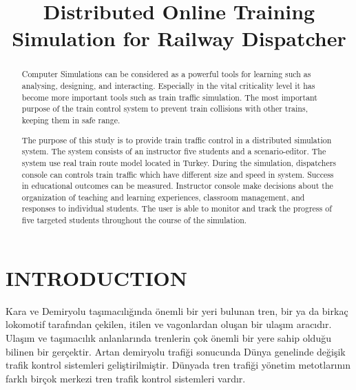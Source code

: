 \documentclass[conference]{IEEEtran}
\begin{document}
\title{Distributed Online Training Simulation for Railway Dispatcher }



\author{


}

\maketitle

\begin{abstract}
Computer Simulations can be considered as a powerful tools for learning such as analysing, designing, and interacting. Especially in the vital criticality level it has become more important tools such as train traffic simulation.
The most important purpose of the train control system to prevent train collisions with other trains, keeping them in safe range.

The purpose of this study is to provide train traffic control in a distributed simulation system. The system consists of an instructor five students and a scenario-editor. The system use real train route model located in Turkey.  During the simulation, dispatchers console can controls train traffic which have different  size and speed in system. Success in educational outcomes can be measured. Instructor console make decisions about the organization of teaching and learning 
experiences, classroom management, and responses to 
individual students. The user is able to monitor and track the progress of five targeted students throughout the course of the simulation.

\end{abstract}

\section{INTRODUCTION}
Kara ve Demiryolu taşımacılığında önemli bir yeri bulunan tren, bir ya da birkaç lokomotif tarafından çekilen, itilen ve vagonlardan oluşan bir ulaşım aracıdır. Ulaşım ve taşımacılık anlanlarında trenlerin çok önemli bir yere sahip olduğu bilinen bir gerçektir. 
Artan demiryolu trafiği sonucunda Dünya genelinde değişik trafik kontrol sistemleri geliştirilmiştir. Dünyada tren trafiği yönetim metotlarının farklı birçok merkezi tren trafik kontrol sistemleri vardır.
\end{document}
